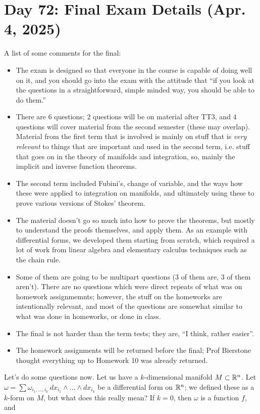 \section{Day 72: Final Exam Details (Apr. 4, 2025)}
A list of some comments for the final:
\begin{itemize}
    \item The exam is designed so that everyone in the course is capable of doing well on it, and you should go into the exam with the attitude that ``if you look at the questions in a straightforward, simple minded way, you should be able to do them.''
    \item There are $6$ questions; $2$ questions will be on material after TT3, and $4$ questions will cover material from the second semester (these may overlap). Material from the first term that is involved is mainly on stuff that is \textit{very relevant} to things that are important and used in the second term, i.e. stuff that goes on in the theory of manifolds and integration, so, mainly the implicit and inverse function theorems.
    \item The second term included Fubini's, change of variable, and the ways how these were applied to integration on manifolds, and ultimately using these to prove various versions of Stokes' theorem.
    \item The material doesn't go so much into how to prove the theorems, but mostly to understand the proofs themselves, and apply them. As an example with differential forms, we developed them starting from scratch, which required a lot of work from linear algebra and elementary calculus techniques such as the chain rule.
    \item Some of them are going to be multipart questions ($3$ of them are, $3$ of them aren't). There are no questions which were direct repeats of what was on homework assignmemnts; however, the stuff on the homeworks are intentionally relevant, and most of the questions are somewhat similar to what was done in homeworks, or done in class.
    \item The final is not harder than the term tests; they are, ``I think, rather easier''.
    \item The homework assignments will be returned before the final; Prof Bierstone thought everything up to Homework 10 was already returned.
\end{itemize}
Let's do some questions now. Let us have a $k$-dimensional manifold $M \subset \mathbb R^n$. Let $\omega = \sum \omega_{i_1, \dots, i_k} \, dx_{i_1} \wedge \dots \wedge dx_{i_k}$ be a differential form on $\mathbb R^n$; we defined these as a $k$-form on $M$, but what does this really mean? If $k = 0$, then $\omega$ is a function $f$, and
